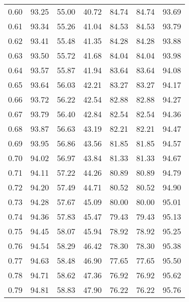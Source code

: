 \begin{tabular}{|c|c|c|c|c|c|c|}
      0.60 &     93.25 &     55.00 &      40.72 &   84.74 &      84.74 &         93.69 \\
      0.61 &     93.34 &     55.26 &      41.04 &   84.53 &      84.53 &         93.79 \\
      0.62 &     93.41 &     55.48 &      41.35 &   84.28 &      84.28 &         93.88 \\
      0.63 &     93.50 &     55.72 &      41.68 &   84.04 &      84.04 &         93.98 \\
      0.64 &     93.57 &     55.87 &      41.94 &   83.64 &      83.64 &         94.08 \\
      0.65 &     93.64 &     56.03 &      42.21 &   83.27 &      83.27 &         94.17 \\
      0.66 &     93.72 &     56.22 &      42.54 &   82.88 &      82.88 &         94.27 \\
      0.67 &     93.79 &     56.40 &      42.84 &   82.54 &      82.54 &         94.36 \\
      0.68 &     93.87 &     56.63 &      43.19 &   82.21 &      82.21 &         94.47 \\
      0.69 &     93.95 &     56.86 &      43.56 &   81.85 &      81.85 &         94.57 \\
      0.70 &     94.02 &     56.97 &      43.84 &   81.33 &      81.33 &         94.67 \\
      0.71 &     94.11 &     57.22 &      44.26 &   80.89 &      80.89 &         94.79 \\
      0.72 &     94.20 &     57.49 &      44.71 &   80.52 &      80.52 &         94.90 \\
      0.73 &     94.28 &     57.67 &      45.09 &   80.00 &      80.00 &         95.01 \\
      0.74 &     94.36 &     57.83 &      45.47 &   79.43 &      79.43 &         95.13 \\
      0.75 &     94.45 &     58.07 &      45.94 &   78.92 &      78.92 &         95.25 \\
      0.76 &     94.54 &     58.29 &      46.42 &   78.30 &      78.30 &         95.38 \\
      0.77 &     94.63 &     58.48 &      46.90 &   77.65 &      77.65 &         95.50 \\
      0.78 &     94.71 &     58.62 &      47.36 &   76.92 &      76.92 &         95.62 \\
      0.79 &     94.81 &     58.83 &      47.90 &   76.22 &      76.22 &         95.76 \\

\end{tabular}
